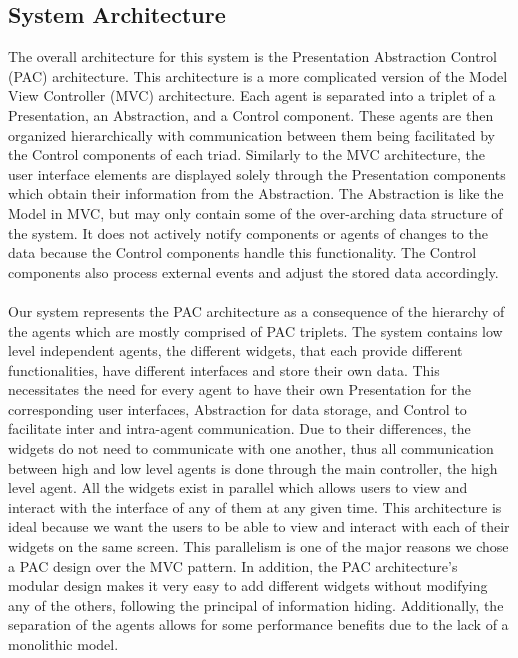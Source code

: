 \documentclass[]{article}
\begin{document}
\subsection{System Architecture}
\label{sub:system_architecture}
The overall architecture for this system is the Presentation Abstraction Control (PAC) architecture. This architecture is a more complicated version of the Model View Controller (MVC) architecture. Each agent is separated into a triplet of a Presentation, an Abstraction, and a Control component. These agents are then organized hierarchically with communication between them being facilitated by the Control components of each triad. Similarly to the MVC architecture, the user interface elements are displayed solely through the Presentation components which obtain their information from the Abstraction. The Abstraction is like the Model in MVC, but may only contain some of the over-arching data structure of the system. It does not actively notify components or agents of changes to the data because the Control components handle this functionality. The Control components also process external events and adjust the stored data accordingly.
\\
\\
Our system represents the PAC architecture as a consequence of the hierarchy of the agents which are mostly comprised of PAC triplets. The system contains low level independent agents, the different widgets, that each provide different functionalities, have different interfaces and store their own data. This necessitates the need for every agent to have their own Presentation for the corresponding user interfaces, Abstraction for data storage, and Control to facilitate inter and intra-agent communication. Due to their differences, the widgets do not need to communicate with one another, thus all communication between high and low level agents is done through the main controller, the high level agent. All the widgets exist in parallel which allows users to view and interact with the interface of any of them at any given time. This architecture is ideal because we want the users to be able to view and interact with each of their widgets on the same screen. This parallelism is one of the major reasons we chose a PAC design over the MVC pattern. In addition, the PAC architecture's modular design makes it very easy to add different widgets without modifying any of the others, following the principal of information hiding. Additionally, the separation of the agents allows for some performance benefits due to the lack of a monolithic model. 
\end{document}
